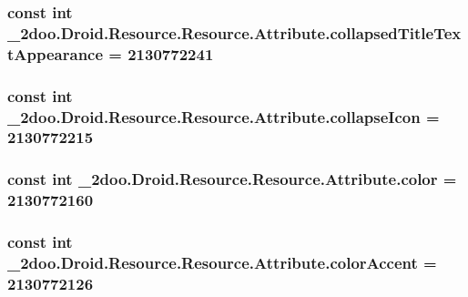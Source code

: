 \hypertarget{class__2doo_1_1_droid_1_1_resource_1_1_attribute_be67442a51891af34375b65aa1a90592}{
\subsubsection[{collapsedTitleTextAppearance}]{\setlength{\rightskip}{0pt plus 5cm}const int \_\-2doo.Droid.Resource.Resource.Attribute.collapsedTitleTextAppearance = 2130772241}}
\label{class__2doo_1_1_droid_1_1_resource_1_1_attribute_be67442a51891af34375b65aa1a90592}


\hypertarget{class__2doo_1_1_droid_1_1_resource_1_1_attribute_b43bb89f82ff082dc5915a32815ab29a}{
\subsubsection[{collapseIcon}]{\setlength{\rightskip}{0pt plus 5cm}const int \_\-2doo.Droid.Resource.Resource.Attribute.collapseIcon = 2130772215}}
\label{class__2doo_1_1_droid_1_1_resource_1_1_attribute_b43bb89f82ff082dc5915a32815ab29a}


\hypertarget{class__2doo_1_1_droid_1_1_resource_1_1_attribute_42d37e52ccca2e4980a62050209e9fc4}{
\subsubsection[{color}]{\setlength{\rightskip}{0pt plus 5cm}const int \_\-2doo.Droid.Resource.Resource.Attribute.color = 2130772160}}
\label{class__2doo_1_1_droid_1_1_resource_1_1_attribute_42d37e52ccca2e4980a62050209e9fc4}


\hypertarget{class__2doo_1_1_droid_1_1_resource_1_1_attribute_7b0dcd02a0d0d6137f65712a10779c24}{
\subsubsection[{colorAccent}]{\setlength{\rightskip}{0pt plus 5cm}const int \_\-2doo.Droid.Resource.Resource.Attribute.colorAccent = 2130772126}}
\label{class__2doo_1_1_droid_1_1_resource_1_1_attribute_7b0dcd02a0d0d6137f65712a10779c24}


